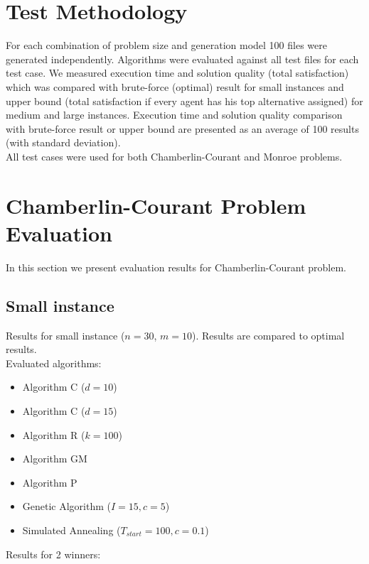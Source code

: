 \section{Test Methodology}

For each combination of problem size and generation model 100 files were generated independently. Algorithms were evaluated against all test files for each test case. We measured execution time and solution quality (total satisfaction) which was compared with brute-force (optimal) result for small instances and upper bound (total satisfaction if every agent has his top alternative assigned) for medium and large instances. Execution time and solution quality comparison with brute-force result or upper bound are presented as an average of 100 results (with standard deviation).
\\

All test cases were used for both Chamberlin-Courant and Monroe problems.

\section{Chamberlin-Courant Problem Evaluation}

In this section we present evaluation results for Chamberlin-Courant problem.

\subsection{Small instance}

Results for small instance ($n = 30$, $m = 10$). Results are compared to optimal results.
\\

Evaluated algorithms:
\begin{itemize}
	\item Algorithm C ($d = 10$)
	\item Algorithm C ($d = 15$)
	\item Algorithm R ($k = 100$)
	\item Algorithm GM
	\item Algorithm P
	\item Genetic Algorithm ($I = 15, c = 5$)
	\item Simulated Annealing ($T_{start} = 100, c = 0.1$)
\end{itemize}

Results for 2 winners:
\\

